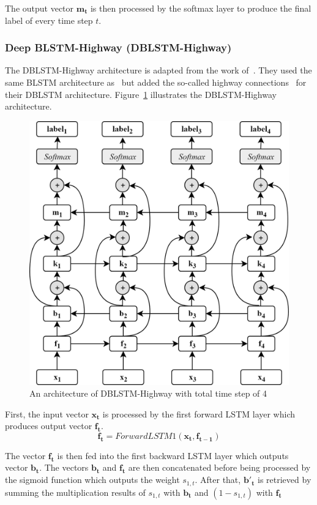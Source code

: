 The output vector $\mathbf{m_{t}}$ is then processed by the softmax layer to produce the final label of every time step $t$.

\subsubsection{Deep BLSTM-Highway (DBLSTM-Highway)}
The DBLSTM-Highway architecture is adapted from the work of~\cite{he2017deep}. They used the same BLSTM architecture as~\cite{zhou2015end} but added the so-called highway connections~\citep{srivastava2015training} for their DBLSTM architecture. Figure~\ref{fig:dblstmhighway} illustrates the DBLSTM-Highway architecture.

\begin{figure}
	\centering
	\includegraphics[width=0.75\linewidth]{images/dblstmhighway}
	\caption{An architecture of DBLSTM-Highway with total time step of 4}
	\label{fig:dblstmhighway}
\end{figure}

First, the input vector $\mathbf{x_{t}}$ is processed by the first forward LSTM layer which produces output vector $\mathbf{f_{t}}$.
\begin{equation}
\label{eq:forwardhighway1}
\mathbf{f_{t}} = ForwardLSTM1(\mathbf{x_{t}}, \mathbf{f_{t-1}})
\end{equation}

The vector $\mathbf{f_{t}}$ is then fed into the first backward LSTM layer which outputs vector $\mathbf{b_{t}}$. The vectors $\mathbf{b_{t}}$ and $\mathbf{f_{t}}$ are then concatenated before being processed by the sigmoid function which outputs the weight $s_{1,t}$. After that, $\mathbf{b'_{t}}$ is retrieved by summing the multiplication results of $s_{1,t}$ with $\mathbf{b_{t}}$ and $(1 - s_{1,t})$ with $\mathbf{f_{t}}$

